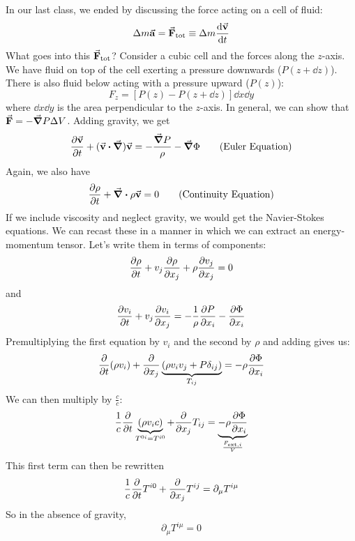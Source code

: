\documentclass[a4paper,twoside,master.tex]{subfiles}
\begin{document}

In our last class, we ended by discussing the force acting on a cell of fluid:
\begin{equation}
    \Delta m \va{a} = \va{F}_{\text{tot}} \equiv \Delta m \dv{\va{v}}{t}
\end{equation}
What goes into this $ \va{F}_{\text{tot}} $? Consider a cubic cell and the forces along the $ z $-axis. We have fluid on top of the cell exerting a pressure downwards ($ P(z+ \dd{z}) $). There is also fluid below acting with a pressure upward ($ P(z) $):
\begin{equation}
    F_z = [P(z) - P(z+ \dd{z})] \dd{x} \dd{y} 
\end{equation}
where $ \dd{x} \dd{y} $ is the area perpendicular to the $ z $-axis. In general, we can show that $ \va{F} = - \grad{P} \Delta V $. Adding gravity, we get
\begin{equation}
    \pdv{\va{v}}{t} + (\va{v} \vdot \grad) \va{v} = - \frac{\grad{P}}{\rho} - \grad{\Phi} \tag{Euler Equation}
\end{equation}
Again, we also have
\begin{equation}
    \pdv{\rho}{t} + \div{\rho \va{v}} = 0 \tag{Continuity Equation}
\end{equation}
If we include viscosity and neglect gravity, we would get the Navier-Stokes equations. We can recast these in a manner in which we can extract an energy-momentum tensor. Let's write them in terms of components:
\begin{equation}
    \pdv{\rho}{t} + v_j \pdv{\rho}{x_j} + \rho \pdv{v_j}{x_j} = 0
\end{equation}
and
\begin{equation}
    \pdv{v_i}{t} + v_j \pdv{v_i}{x_j} = - \frac{1}{\rho} \pdv{P}{x_i} - \pdv{\Phi}{x_i}
\end{equation}
Premultiplying the first equation by $ v_i $ and the second by $ \rho $ and adding gives us:
\begin{equation}
    \pdv{t}(\rho v_i) + \pdv{x_j}\underbrace{\left(\rho v_i v_j + P \delta_{ij}\right)}_{T_{ij}} = - \rho \pdv{\Phi}{x_i}
\end{equation}
We can then multiply by $ \frac{c}{c} $:
\begin{equation}
    \frac{1}{c} \pdv{t}\underbrace{(\rho v_i c)}_{T^{0i} = T^{i0}} + \pdv{x_j}T_{ij} = \underbrace{- \rho \pdv{\Phi}{x_i}}_{\frac{F_{\text{ext}, i}}{V}}
\end{equation}
This first term can then be rewritten
\begin{equation}
    \frac{1}{c} \pdv{t}T^{i0} + \pdv{x_j}T^{ij} = \partial_{\mu} T^{i \mu}
\end{equation}
So in the absence of gravity,
\begin{equation}
    \partial_{\mu} T^{i \mu} = 0
\end{equation}
\end{document}
